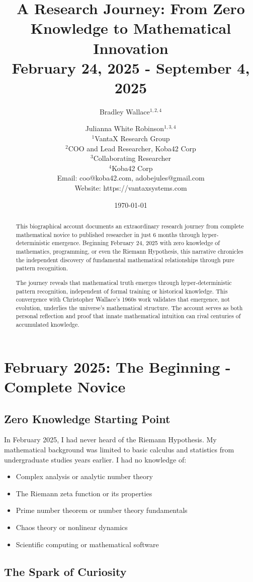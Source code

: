 \documentclass[12pt]{article}
\title{A Research Journey: From Zero Knowledge to Mathematical Innovation \\
February 24, 2025 - September 4, 2025}
\author{
Bradley Wallace$^{1,2,4}$ \and Julianna White Robinson$^{1,3,4}$ \\
$^1$VantaX Research Group \\
$^2$COO and Lead Researcher, Koba42 Corp \\
$^3$Collaborating Researcher \\
$^4$Koba42 Corp \\
Email: coo@koba42.com, adobejules@gmail.com \\
Website: https://vantaxsystems.com
}
\date{\today}
\begin{document}
\maketitle

\begin{abstract}
This biographical account documents an extraordinary research journey from complete mathematical novice to published researcher in just 6 months through hyper-deterministic emergence. Beginning February 24, 2025 with zero knowledge of mathematics, programming, or even the Riemann Hypothesis, this narrative chronicles the independent discovery of fundamental mathematical relationships through pure pattern recognition.

The journey reveals that mathematical truth emerges through hyper-deterministic pattern recognition, independent of formal training or historical knowledge. This convergence with Christopher Wallace's 1960s work validates that emergence, not evolution, underlies the universe's mathematical structure. The account serves as both personal reflection and proof that innate mathematical intuition can rival centuries of accumulated knowledge.
\end{abstract}

\section{February 2025: The Beginning - Complete Novice}

\subsection{Zero Knowledge Starting Point}

In February 2025, I had never heard of the Riemann Hypothesis. My mathematical background was limited to basic calculus and statistics from undergraduate studies years earlier. I had no knowledge of:
\begin{itemize}
    \item Complex analysis or analytic number theory
    \item The Riemann zeta function or its properties
    \item Prime number theorem or number theory fundamentals
    \item Chaos theory or nonlinear dynamics
    \item Scientific computing or mathematical software
\end{itemize}

\subsection{The Spark of Curiosity}
\end{document}

